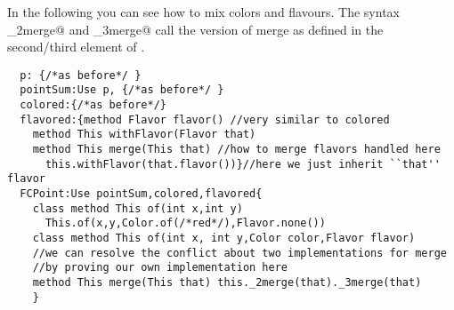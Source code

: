 In the following you can see how to mix colors and flavours. The syntax \Q@_2merge@ and   \Q@_3merge@
call the version of merge as defined in the second/third element of \use.
\begin{lstlisting}
  p: {/*as before*/ }
  pointSum:Use p, {/*as before*/ }
  colored:{/*as before*/}
  flavored:{method Flavor flavor() //very similar to colored
    method This withFlavor(Flavor that)
    method This merge(This that) //how to merge flavors handled here
      this.withFlavor(that.flavor())}//here we just inherit ``that'' flavor
  FCPoint:Use pointSum,colored,flavored{
    class method This of(int x,int y)
      This.of(x,y,Color.of(/*red*/),Flavor.none())
    class method This of(int x, int y,Color color,Flavor flavor)
    //we can resolve the conflict about two implementations for merge
    //by proving our own implementation here
    method This merge(This that) this._2merge(that)._3merge(that)
    }
\end{lstlisting}  
